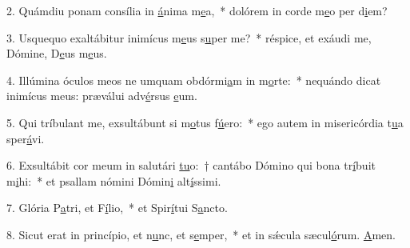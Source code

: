 2. Quámdiu ponam consília in \uline{á}nima m\uline{e}a,~* dolórem in corde m\uline{e}o per d\uline{i}em?\par 
3. Usquequo exaltábitur inimícus m\uline{e}us s\uline{u}per me?~* réspice, et exáudi me, Dómine, D\uline{e}us m\uline{e}us.\par 
4. Illúmina óculos meos ne umquam obdórmi\uline{a}m in m\uline{o}rte:~* nequándo dicat inimícus meus: præválui adv\uline{é}rsus \uline{e}um.\par 
5. Qui tríbulant me, exsultábunt si m\uline{o}tus f\uline{ú}ero:~* ego autem in misericórdia t\uline{u}a sper\uline{á}vi.\par 
6. Exsultábit cor meum in salutári \uline{tu}o:~† cantábo Dómino qui bona tr\uline{í}buit m\uline{i}hi:~* et psallam nómini Dómin\uline{i} alt\uline{í}ssimi.\par 
7. Glória P\uline{a}tri, et F\uline{í}lio,~* et Spir\uline{í}tui S\uline{a}ncto.\par 
8. Sicut erat in princípio, et n\uline{u}nc, et s\uline{e}mper,~* et in sǽcula sæcul\uline{ó}rum. \uline{A}men.\par 
